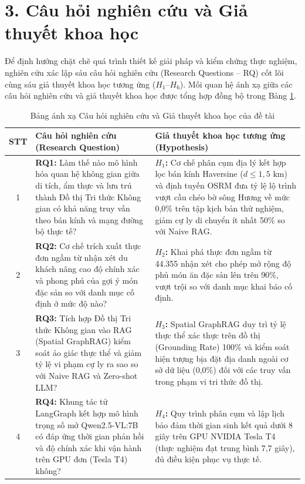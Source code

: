 \section*{3. Câu hỏi nghiên cứu và Giả thuyết khoa học}
{}

Để định hướng chặt chẽ quá trình thiết kế giải pháp và kiểm chứng thực nghiệm, nghiên cứu xác lập sáu câu hỏi nghiên cứu (Research Questions -- RQ) cốt lõi cùng sáu giả thuyết khoa học tương ứng ($H_1$--$H_6$). Mối quan hệ ánh xạ giữa các câu hỏi nghiên cứu và giả thuyết khoa học được tổng hợp đồng bộ trong Bảng \ref{tab:rq-hypotheses-mapping}.

\begin{table}[htbp]
\centering
\caption{Bảng ánh xạ Câu hỏi nghiên cứu và Giả thuyết khoa học của đề tài}
\label{tab:rq-hypotheses-mapping}
\small
\renewcommand{\arraystretch}{1.15}
\begin{tabularx}{\textwidth}{c X X}
\hline
\textbf{STT} & \textbf{Câu hỏi nghiên cứu (Research Question)} & \textbf{Giả thuyết khoa học tương ứng (Hypothesis)} \\
\hline
1 & \textbf{RQ1:} Làm thế nào mô hình hóa quan hệ không gian giữa di tích, ẩm thực và lưu trú thành Đồ thị Tri thức Không gian có khả năng truy vấn theo bán kính và mạng đường bộ thực tế? & \textbf{$H_1$:} Cơ chế phân cụm địa lý kết hợp lọc bán kính Haversine ($d \le 1{,}5\text{ km}$) và định tuyến OSRM đưa tỷ lệ lộ trình vượt cầu chéo bờ sông Hương về mức 0,0\% trên tập kịch bản thử nghiệm, giảm cự ly di chuyển ít nhất 50\% so với Naive RAG. \\
2 & \textbf{RQ2:} Cơ chế trích xuất thực đơn ngầm từ nhận xét du khách nâng cao độ chính xác và phong phú của gợi ý món đặc sản so với danh mục cố định ở mức độ nào? & \textbf{$H_2$:} Khai phá thực đơn ngầm từ 44.355 nhận xét cho phép mở rộng độ phủ món ăn đặc sản lên trên 90\%, vượt trội so với danh mục khai báo cố định. \\
3 & \textbf{RQ3:} Tích hợp Đồ thị Tri thức Không gian vào RAG (Spatial GraphRAG) kiểm soát ảo giác thực thể và giảm tỷ lệ vi phạm cự ly ra sao so với Naive RAG và Zero-shot LLM? & \textbf{$H_3$:} Spatial GraphRAG duy trì tỷ lệ thực thể xác thực trên đồ thị (Grounding Rate) 100\% và kiểm soát hiện tượng bịa đặt địa danh ngoài cơ sở dữ liệu (0,0\%) đối với các truy vấn trong phạm vi tri thức đồ thị. \\
4 & \textbf{RQ4:} Khung tác tử LangGraph kết hợp mô hình trọng số mở Qwen2.5-VL:7B có đáp ứng thời gian phản hồi và độ chính xác khi vận hành trên GPU đơn (Tesla T4) không? & \textbf{$H_4$:} Quy trình phân cụm và lập lịch bảo đảm thời gian sinh kết quả dưới 8 giây trên GPU NVIDIA Tesla T4 (thực nghiệm đạt trung bình 7,7 giây), đủ điều kiện phục vụ thực tế. \\

\end{tabularx}
\end{table}
